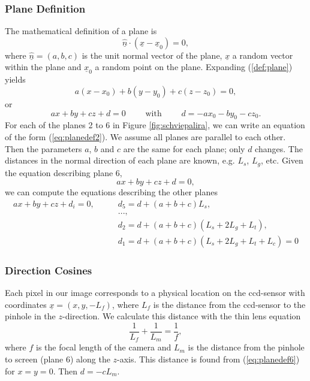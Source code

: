 \documentclass[smallextended]{svjour3}       %
\begin{document}
\subsubsection{Plane Definition}
The mathematical definition of a plane is
\begin{equation}
	\label{def:plane}
	\underline{\hat{n}} \cdot (\underline{x}-\underline{x}_0) = 0,
\end{equation}
where $\underline{\hat{n}} = (a,b,c)$ is the unit normal vector of the plane, $\underline{x}$ a random vector within the plane and $\underline{x}_0$ a random point on the plane. Expanding (\ref{def:plane}) yields
\begin{equation}
	a(x-x_0) + b(y-y_0) + c(z-z_0) = 0, 
\end{equation}
or 
\begin{equation}
	\label{eq:planedef2}
	ax+by+cz + d = 0 \qquad \mbox{ with } \qquad d = - a x_0 - b y_0 - c z_0.
\end{equation}
For each of the planes 2 to 6 in Figure \ref{fig:schviepalira}, we can write an equation of the form (\ref{eq:planedef2}). We assume all planes are parallel to each other. Then the parameters $a$, $b$ and $c$ are the same for each plane; only $d$ changes. The distances in the normal direction of each plane are known, e.g. $L_s$, $L_g$, etc. Given the equation describing plane 6, 
\begin{equation}
\label{eq:planedef6}
	a x + b y + c z + d = 0,
\end{equation}
we can compute the equations describing the other planes
\begin{align}
a x + b y + c z + d_i = 0, \qquad  
& d_5 = d + (a+b+c) L_s, \\
& ..., \nonumber \\ 
& d_2 = d + (a+b+c) (L_s+2L_g+L_t), \\
\label{eq:planedef1}
& d_1 = d + (a+b+c) (L_s+2L_g+L_t+L_c) = 0 
\end{align}

\subsubsection{Direction Cosines}
Each pixel in our image corresponds to a physical location on the ccd-sensor with coordinates $\underline{x} = (x,y, -L_f)$, where $L_f$ is the distance from the ccd-sensor to the pinhole in the $z$-direction. We calculate this distance with the thin lens equation
\begin{equation}
 \frac{1}{L_f} + \frac{1}{L_m} = \frac{1}{f},
\end{equation}
where $f$ is the focal length of the camera and $L_m$ is the distance from the pinhole to screen (plane 6) along the $z$-axis. This distance is found from (\ref{eq:planedef6}) for $x=y=0$. Then $d = - c L_m$.
\end{document}
